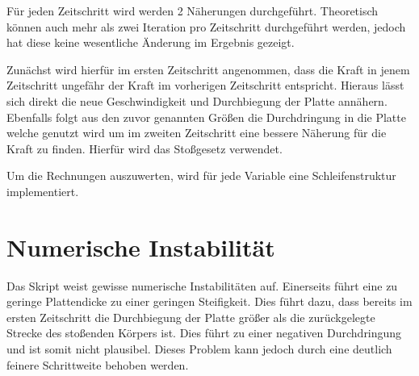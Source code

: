 Für jeden Zeitschritt wird werden 2 Näherungen durchgeführt. Theoretisch können auch mehr als zwei Iteration pro Zeitschritt durchgeführt werden, jedoch hat diese keine wesentliche Änderung im Ergebnis gezeigt.

Zunächst wird hierfür im ersten Zeitschritt angenommen, dass die Kraft in jenem Zeitschritt ungefähr der Kraft im vorherigen Zeitschritt entspricht. Hieraus lässt sich direkt die neue Geschwindigkeit und Durchbiegung der Platte annähern. Ebenfalls folgt aus den zuvor genannten Größen die Durchdringung in die Platte welche genutzt wird um im zweiten Zeitschritt eine bessere Näherung für die Kraft zu finden. Hierfür wird das Stoßgesetz verwendet.

Um die Rechnungen auszuwerten, wird für jede Variable eine Schleifenstruktur implementiert. 


\section*{Numerische Instabilität}

Das Skript weist gewisse numerische Instabilitäten auf. Einerseits führt eine zu geringe Plattendicke zu einer geringen Steifigkeit. Dies führt dazu, dass bereits im ersten Zeitschritt die Durchbiegung der Platte größer als die zurückgelegte Strecke des stoßenden Körpers ist. Dies führt zu einer negativen Durchdringung und ist somit nicht plausibel. Dieses Problem kann jedoch durch eine deutlich feinere Schrittweite behoben werden.






